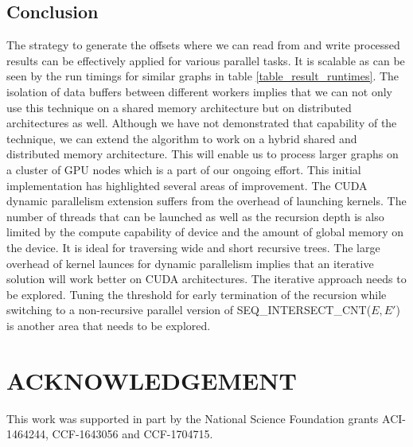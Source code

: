 \documentclass[conference]{IEEEtran}
\begin{document}
\subsection{Conclusion}
The strategy to generate the offsets where we can read from and write processed results can be effectively applied for various parallel tasks. It is scalable as can be seen by the run timings for similar graphs in table \ref{table_result_runtimes}. The isolation of data buffers between different workers implies that we can not only use this technique on a shared memory architecture but on distributed architectures as well. Although we have not demonstrated that capability of the technique, we can extend the algorithm to work on a hybrid shared and distributed memory architecture. This will enable us to process larger graphs on a cluster of GPU nodes which is a part of our ongoing effort. This initial implementation has highlighted several areas of improvement. The CUDA dynamic parallelism extension suffers from the overhead of launching kernels. The number of threads that can be launched as well as the recursion depth is also limited by the compute capability of device\cite{b21} and the amount of global memory on the device. It is ideal for traversing wide and short recursive trees. The large overhead of kernel launces for dynamic parallelism implies that an iterative solution will work better on CUDA architectures. The iterative approach needs to be explored. Tuning the threshold for early termination of the recursion while switching to a non-recursive parallel version of SEQ\_INTERSECT\_CNT($E, E'$) is another area that needs to be explored.

\section*{ACKNOWLEDGEMENT}
This work was supported in part by the National Science Foundation grants ACI-1464244, CCF-1643056 and CCF-1704715.
\end{document}
